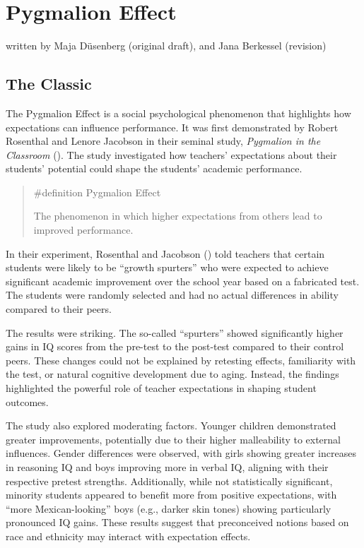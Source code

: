 \documentclass[
  letterpaper,
]{book}
\begin{document}

\chapter{\texorpdfstring{{Pygmalion
Effect}}{Pygmalion Effect}}\label{pygmalion-effect}

{written by Maja Düsenberg (original draft), and Jana Berkessel
(revision)}

\section{The Classic}\label{the-classic}

The Pygmalion Effect is a social psychological phenomenon that
highlights how expectations can influence performance. It was first
demonstrated by Robert Rosenthal and Lenore Jacobson in their seminal
study, \emph{Pygmalion in the Classroom}
().
The study investigated how teachers' expectations about their students'
potential could shape the students' academic performance.

\begin{quote}
\label{def-pygmalioneffect}{\#definition} Pygmalion
Effect

The phenomenon in which higher expectations from others lead to improved
performance.
\end{quote}

In their experiment, Rosenthal and Jacobson
() told teachers that
certain students were likely to be ``growth spurters'' who were expected
to achieve significant academic improvement over the school year based
on a fabricated test. The students were randomly selected and had no
actual differences in ability compared to their peers.

The results were striking. The so-called ``spurters'' showed
significantly higher gains in IQ scores from the pre-test to the
post-test compared to their control peers. These changes could not be
explained by retesting effects, familiarity with the test, or natural
cognitive development due to aging. Instead, the findings highlighted
the powerful role of teacher expectations in shaping student outcomes.

The study also explored moderating factors. Younger children
demonstrated greater improvements, potentially due to their higher
malleability to external influences. Gender differences were observed,
with girls showing greater increases in reasoning IQ and boys improving
more in verbal IQ, aligning with their respective pretest strengths.
Additionally, while not statistically significant, minority students
appeared to benefit more from positive expectations, with ``more
Mexican-looking'' boys (e.g., darker skin tones) showing particularly
pronounced IQ gains. These results suggest that preconceived notions
based on race and ethnicity may interact with expectation effects.
\end{document}
